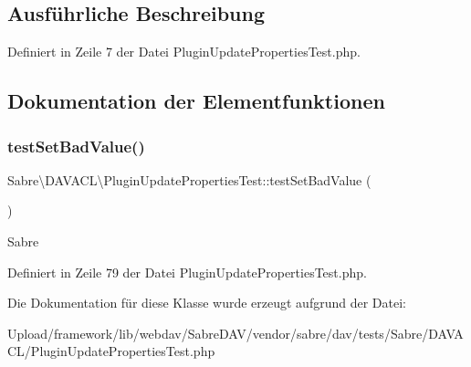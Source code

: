\subsection{Ausführliche Beschreibung}


Definiert in Zeile 7 der Datei Plugin\+Update\+Properties\+Test.\+php.



\subsection{Dokumentation der Elementfunktionen}
\mbox{\label{class_sabre_1_1_d_a_v_a_c_l_1_1_plugin_update_properties_test_af74cea9e5be67819c4dba82ed3cfe8ba}} 
\subsubsection{\texorpdfstring{test\+Set\+Bad\+Value()}{testSetBadValue()}}
{\footnotesize\ttfamily Sabre\textbackslash{}\+D\+A\+V\+A\+C\+L\textbackslash{}\+Plugin\+Update\+Properties\+Test\+::test\+Set\+Bad\+Value (\begin{DoxyParamCaption}{ }\end{DoxyParamCaption})}

Sabre 

Definiert in Zeile 79 der Datei Plugin\+Update\+Properties\+Test.\+php.



Die Dokumentation für diese Klasse wurde erzeugt aufgrund der Datei\+:\begin{DoxyCompactItemize}
\item 
Upload/framework/lib/webdav/\+Sabre\+D\+A\+V/vendor/sabre/dav/tests/\+Sabre/\+D\+A\+V\+A\+C\+L/Plugin\+Update\+Properties\+Test.\+php\end{DoxyCompactItemize}
